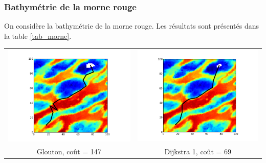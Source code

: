 \subsubsection{Bathymétrie de la morne rouge}
On considère la bathymétrie de la morne rouge. Les résultats sont présentés dans la table \ref{tab_morne}.
\begin{table}
\begin{tabular}{cc}
\includegraphics[scale=0.42]{../data/greedy/plot_A_10_17_B_91_77_iteration_015.png} &
\includegraphics[scale=0.42]{../data/anneaux/plot_A_10_17_B_91_77_iteration_011.png} \\
Glouton, coût = 147&Dijkstra 1, coût = 69\\

\end{tabular}
\end{table}
